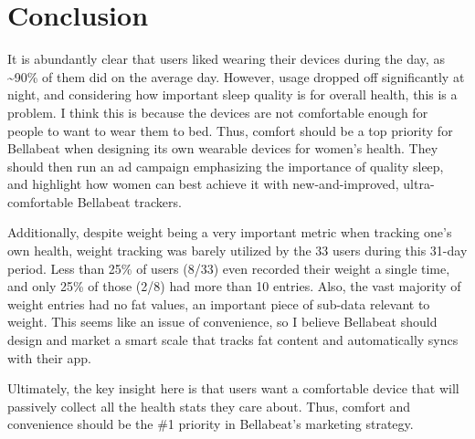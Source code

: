 \documentclass[
]{article}
\begin{document}
\hypertarget{conclusion}{%
\section{Conclusion}\label{conclusion}}

It is abundantly clear that users liked wearing their devices during the
day, as \textasciitilde90\% of them did on the average day. However,
usage dropped off significantly at night, and considering how important
sleep quality is for overall health, this is a problem. I think this is
because the devices are not comfortable enough for people to want to
wear them to bed. {Thus, comfort should be a top priority for Bellabeat
when designing its own wearable devices for women's health. They should
then run an ad campaign emphasizing the importance of quality sleep, and
highlight how women can best achieve it with new-and-improved,
ultra-comfortable Bellabeat trackers.}

Additionally, despite weight being a very important metric when tracking
one's own health, weight tracking was barely utilized by the 33 users
during this 31-day period. Less than 25\% of users (8/33) even recorded
their weight a single time, and only 25\% of those (2/8) had more than
10 entries. Also, the vast majority of weight entries had no fat values,
an important piece of sub-data relevant to weight. {This seems like an
issue of convenience, so I believe Bellabeat should design and market a
smart scale that tracks fat content and automatically syncs with their
app.}

Ultimately, the key insight here is that users want a comfortable device
that will passively collect all the health stats they care about. Thus,
comfort and convenience should be the \#1 priority in Bellabeat's
marketing strategy.
\end{document}
